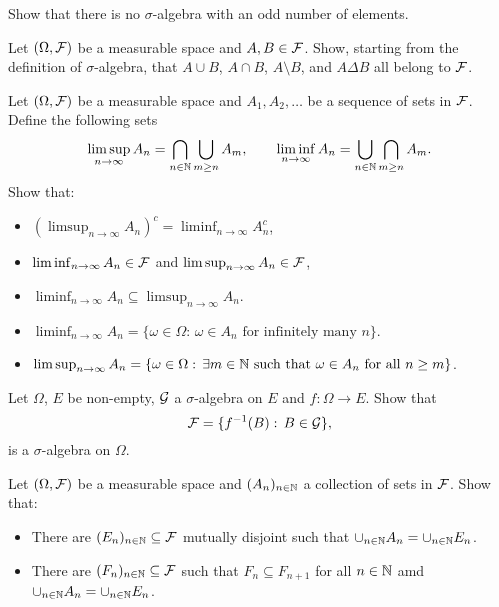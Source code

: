 
\begin{problem}
    Show that there is no $\sigma$-algebra with an odd number of elements.
\end{problem}

\begin{problem}
Let $(\Omega,\mathcal F)$ be a measurable space and $A,B\in \mathcal F$. Show, starting from the definition of $\sigma$-algebra, that $A\cup B$, $A\cap B$, $A\setminus B$, and $A\Delta B$ all belong to $\mathcal F$.
\end{problem}

\begin{problem}
    Let $(\Omega,\mathcal F)$ be a measurable space and $A_1, A_2,\ldots$ be a sequence of sets in $\mathcal F$. Define the following sets
    \begin{equation*}
        \limsup_{n\to\infty} A_n = \bigcap_{n\in \mathbb N} \bigcup_{m\geq n} A_m,\qquad \liminf_{n\to\infty} A_n = \bigcup_{n\in \mathbb N} \bigcap_{m\geq n} A_m.
    \end{equation*}
    Show that:
    \begin{itemize}
        \item $(\limsup_{n\to\infty} A_n)^c = \liminf_{n\to\infty} A_n^c$,
        \item $\liminf_{n\to\infty} A_n \in \mathcal F$ and $\limsup_{n\to\infty} A_n \in \mathcal F$,
        \item $\liminf_{n\to\infty} A_n \subseteq \limsup_{n\to\infty} A_n$.
        \item  $\liminf_{n\to\infty} A_n = \{\omega \in \Omega:\, \omega\in A_n\text{ for infinitely many $n$}\}$.
        \item $\limsup_{n\to\infty} A_n = \{\omega \in \Omega:\, \text{$\exists m\in \mathbb N$ such that $\omega\in A_n$ for all $n\geq m$}\}$.
    \end{itemize}
\end{problem}

\begin{problem}
    Let $\Omega$, $E$ be non-empty, $\mathcal G$ a $\sigma$-algebra on $E$ and $f:\Omega\to E$. Show that 
    \begin{equation*}
        \mathcal F = \{f^{-1}(B):\,B\in \mathcal G\},
    \end{equation*}
    is a $\sigma$-algebra on $\Omega$.
\end{problem}

\begin{problem}
    Let $(\Omega,\mathcal F)$ be a measurable space and $(A_n)_{n\in \mathbb N}$ a collection of sets in $\mathcal F$. Show that:
    \begin{itemize}
        \item There are $(E_n)_{n\in \mathbb N}\subseteq \mathcal F$ mutually disjoint such that $\cup_{n\in \mathbb N} A_n = \cup_{n\in \mathbb N} E_n$.
        \item There are $(F_n)_{n\in \mathbb N}\subseteq \mathcal F$ such that $F_n\subseteq F_{n+1}$ for all $n\in \mathbb N$ amd $\cup_{n\in \mathbb N} A_n = \cup_{n\in \mathbb N} E_n$.
    \end{itemize} 
\end{problem}

